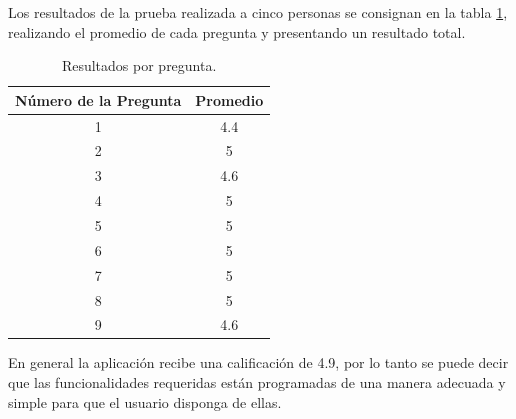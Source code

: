 Los resultados de la prueba realizada a cinco personas se consignan en la tabla \ref{table:enc}, realizando el promedio de cada pregunta y presentando un resultado total.

\begin{table}[H]
	\begin{center}
		\caption{Resultados por pregunta.}
		\label{table:enc}
		\begin{tabular}{|c|c|}
			\hline 
			Número de la Pregunta & Promedio \\ 
			\hline 
			1 & 4.4\\ 
			\hline 
			2 & 5\\ 
			\hline 
			3 & 4.6\\ 
			\hline 
			4 & 5\\ 
			\hline 
			5 & 5\\ 
			\hline 
			6 & 5\\ 
			\hline 
			7 & 5\\ 
			\hline 
			8 & 5\\ 
			\hline 
			9 & 4.6\\ 
			\hline 
		\end{tabular} 
	\end{center}
\end{table}

En general la aplicación recibe una calificación de 4.9, por lo tanto se puede decir que las funcionalidades requeridas están programadas de una manera adecuada y simple para que el usuario disponga de ellas.
